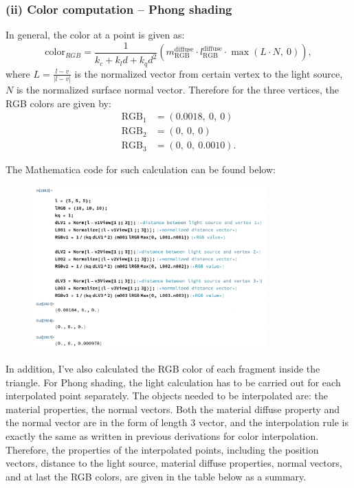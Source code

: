 \documentclass[11pt]{article}
\begin{document}
\subsubsection*{(ii) Color computation -- Phong shading}
In general, the color at a point is given as:
\begin{equation*}
    \text{color}_{RGB} = \frac{1}{k_c + k_l d + k_q d^2}(m_\text{RGB}^\text{diffuse} \cdot l_\text{RGB}^\text{diffuse} \cdot \max(L\cdot N,\ 0)),
\end{equation*}
where $L = \frac{l-v}{|l-v|}$ is the normalized vector from certain vertex to the light source, $N$ is the normalized surface normal vector. Therefore for the three vertices, the RGB colors are given by: 
\begin{align}
    \text{RGB}_1 &= (0.0018,\ 0,\ 0)\\
    \text{RGB}_2 &= (0,\ 0,\ 0)\\
    \text{RGB}_3 &= (0,\ 0,\ 0.0010).
\end{align}

The Mathematica code for such calculation can be found below: 
\begin{figure}[h!t]
    \includegraphics[width=0.8\textwidth]{figures/q1p2.png}
\end{figure}

In addition, I've also calculated the RGB color of each fragment inside the triangle. For Phong shading, the light calculation has to be carried out for each interpolated point separately. The objects needed to be interpolated are: the material properties, the normal vectors. Both the material diffuse property and the normal vector are in the form of length 3 vector, and the interpolation rule is exactly the same as written in previous derivations for color interpolation. Therefore, the properties of the interpolated points, including the position vectors, distance to the light source, material diffuse properties, normal vectors, and at last the RGB colors, are given in the table below as a summary.  
\end{document}
